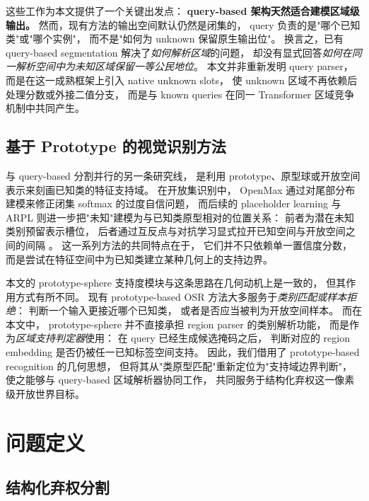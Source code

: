 \documentclass[3p,twocolumn,authoryear]{elsarticle}
\begin{document}
这些工作为本文提供了一个关键出发点：
\textbf{query-based 架构天然适合建模区域级输出。}
然而，现有方法的输出空间默认仍然是闭集的，
query 负责的是"哪个已知类"或"哪个实例"，
而不是"如何为 unknown 保留原生输出位"。
换言之，已有 query-based segmentation 解决了\emph{如何解析区域}的问题，
却没有显式回答\emph{如何在同一解析空间中为未知区域保留一等公民地位}。
本文并非重新发明 query parser，
而是在这一成熟框架上引入 native unknown slots，
使 unknown 区域不再依赖后处理分数或外接二值分支，
而是与 known queries 在同一 Transformer 区域竞争机制中共同产生。
 
\subsection{基于 Prototype 的视觉识别方法}
\label{sec:rw-proto}

与 query-based 分割并行的另一条研究线，
是利用 prototype、原型球或开放空间表示来刻画已知类的特征支持域。
在开放集识别中，
OpenMax 通过对尾部分布建模来修正闭集 softmax 的过度自信问题，
而后续的 placeholder learning 与 ARPL
则进一步把"未知"建模为与已知类原型相对的位置关系：
前者为潜在未知类别预留表示槽位，
后者通过互反点与对抗学习显式拉开已知空间与开放空间之间的间隔
\cite{bendale2016towardsopen,zhou2021learningplaceholders,chen2022adversarialreciprocal}。
这一系列方法的共同特点在于，
它们并不只依赖单一置信度分数，
而是尝试在特征空间中为已知类建立某种几何上的支持边界。

本文的 prototype-sphere 支持度模块与这条思路在几何动机上是一致的，
但其作用方式有所不同。
现有 prototype-based OSR 方法大多服务于\emph{类别匹配或样本拒绝}：
判断一个输入更接近哪个已知类，
或者是否应当被判为开放空间样本。
而在本文中，
prototype-sphere 并不直接承担 region parser 的类别解析功能，
而是作为\emph{区域支持判定器}使用：
在 query 已经生成候选掩码之后，
判断对应的 region embedding 是否仍被任一已知标签空间支持。
因此，我们借用了 prototype-based recognition 的几何思想，
但将其从"类原型匹配"重新定位为"支持域边界判断"，
使之能够与 query-based 区域解析器协同工作，
共同服务于结构化弃权这一像素级开放世界目标。




\section{问题定义}\label{sec:problem}

\subsection{结构化弃权分割}\label{sec:problem:sa}
\end{document}
